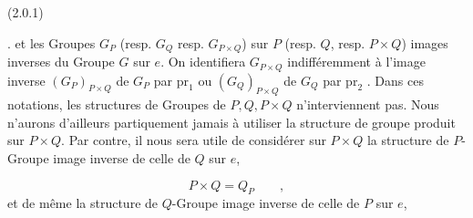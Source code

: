(2.0.1)  \qquad .
et les Groupes $G_P$ (resp. $G_Q$ resp. $G_{P\times Q}$) sur $P$ (resp. $Q$, resp. $P\times Q$) images inverses du Groupe $G$ sur $e$. On identifiera $G_{P\times Q}$ indifféremment à l'image inverse $(G_P)_{P\times Q}$ de $G_P$ par $\mathrm{pr}_1$ ou $(G_Q)_{P\times Q}$ de $G_Q$ par $\mathrm{pr}_2$ . Dans ces notations, les structures de Groupes de $P,Q,P\times Q$ n'interviennent pas. Nous n'aurons d'ailleurs partiquement jamais à utiliser la structure de groupe produit sur $P\times Q$. Par contre, il nous sera utile de considérer sur $P\times Q$ la structure de $P$-Groupe image inverse de celle de $Q$ sur $e$,

\begin{equation}\tag{2.0.2}
P\times Q = Q_P \qquad ,
\end{equation}
et de même la structure de $Q$-Groupe image inverse de celle de $P$ sur $e$,

